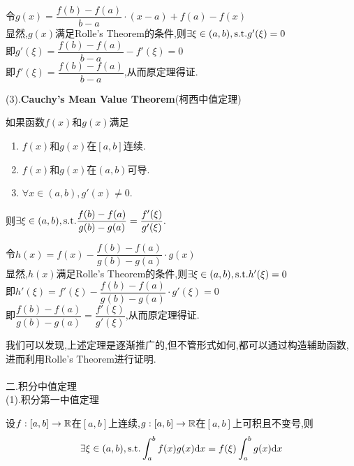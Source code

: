 \documentclass{ctexart}
\begin{document}
\begin{solution}[Proof.]
    令$g(x)=\dfrac{f(b)-f(a)}{b-a}\cdot(x-a)+f(a)-f(x)$\\
    显然,$g(x)$满足Rolle's Theorem的条件,则$\exists\xi\in(a,b),\text{s.t.} g'(\xi)=0$\\
    即$g'(\xi)=\dfrac{f(b)-f(a)}{b-a}-f'(\xi)=0$\\
    即$f'(\xi)=\dfrac{f(b)-f(a)}{b-a}$,从而原定理得证.
\end{solution}\noindent
(3).\textbf{Cauchy's Mean Value Theorem}(柯西中值定理)
\begin{formal}
    如果函数$f(x)$和$g(x)$满足
    \begin{enumerate}[leftmargin=*,label=(\alph*)]
        \item $f(x)$和$g(x)$在$[a,b]$连续.
        \item $f(x)$和$g(x)$在$(a,b)$可导.
        \item $\forall x\in(a,b),g'(x)\neq 0$.
    \end{enumerate}
    则$\exists\xi\in(a,b),\text{s.t.}\dfrac{f(b)-f(a)}{g(b)-g(a)}=\dfrac{f'(\xi)}{g'(\xi)}.$
\end{formal}
\begin{solution}[Proof.]
    令$h(x)=f(x)-\dfrac{f(b)-f(a)}{g(b)-g(a)}\cdot g(x)$\\
    显然,$h(x)$满足Rolle's Theorem的条件,则$\exists\xi\in(a,b),\text{s.t.} h'(\xi)=0$\\
    即$h'(\xi)=f'(\xi)-\dfrac{f(b)-f(a)}{g(b)-g(a)}\cdot g'(\xi)=0$\\
    即$\dfrac{f(b)-f(a)}{g(b)-g(a)}=\dfrac{f'(\xi)}{g'(\xi)}$,从而原定理得证.
\end{solution}\noindent
我们可以发现,上述定理是逐渐推广的,但不管形式如何,都可以通过构造辅助函数,进而利用Rolle's Theorem进行证明.\\
\\
二.积分中值定理 \\
(1).积分第一中值定理
\begin{formal}[积分第一中值定理]
    设$f:[a,b]\to\mathbb{R}$在$[a,b]$上连续,$g:[a,b]\to\mathbb{R}$在$[a,b]$上可积且不变号,则
    $$\exists\xi\in(a,b),\text{s.t.}\int_{a}^{b}{f(x)g(x)\mathrm{d} x}=f(\xi)\int_{a}^{b}{g(x)\mathrm{d} x}$$
\end{formal}
\end{document}
